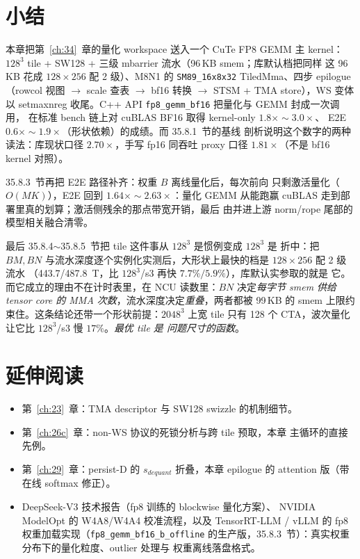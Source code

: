 \section{小结}

本章把第~\ref{ch:34}~章的量化 workspace 送入一个 CuTe FP8 GEMM 主 kernel：
$128^3$ tile + SW128 + 三级 mbarrier 流水（96\,KB smem；库默认档把同样
这 96\,KB 花成 $128\times256$ 配 2 级）、M8N1 的
\texttt{SM89\_16x8x32} TiledMma、四步 epilogue（rowcol 视图 $\to$ scale
查表 $\to$ bf16 转换 $\to$ STSM + TMA store），WS 变体以 setmaxnreg
收尾。C++ API \texttt{fp8\_gemm\_bf16} 把量化与 GEMM 封成一次调用，
在标准 bench 链上对 cuBLAS BF16 取得 kernel-only $1.8\times\sim3.0\times$、
E2E $0.6\times\sim1.9\times$（形状依赖）的成绩。而 35.8.1~节的基线
剖析说明这个数字的两种读法：库现状口径 $2.70\times$，手写 fp16 同吞吐 proxy 口径
$1.81\times$（不是 bf16 kernel 对照）。

35.8.3~节再把 E2E 路径补齐：权重 $B$ 离线量化后，每次前向
只剩激活量化（$O(MK)$），E2E 回到 $1.64\times\sim2.63\times$：量化 GEMM
从能跑赢 cuBLAS 走到部署里真的划算；激活侧残余的那点带宽开销，最后
由并进上游 norm/rope 尾部的模型相关融合清零。

最后 35.8.4$\sim$35.8.5~节把 tile 这件事从 $128^3$ 是惯例变成 $128^3$ 是
折中：把 $BM,BN$ 与流水深度逐个实例化实测后，大形状上最快的档是
$128\times256$ 配 2 级流水
（443.7/487.8~T，比 $128^3$/s3 再快 $7.7\%/5.9\%$），库默认实参取的就是
它。而它成立的理由不在计时表里，在 NCU 读数里：$BN$ 决定\emph{每字节
smem 供给 tensor core 的 MMA 次数}，流水深度决定\emph{重叠}，两者都被
99\,KB 的 smem 上限约束住。这条结论还带一个形状前提：$2048^3$ 上宽 tile
只有 128 个 CTA，波次量化让它比 $128^3$/s3 慢 $17\%$。\emph{最优 tile 是
问题尺寸的函数}。

\section*{延伸阅读}

\begin{itemize}[itemsep=1pt,topsep=2pt]
  \item 第~\ref{ch:23}~章：TMA descriptor 与 SW128 swizzle 的机制细节。
  \item 第~\ref{ch:26c}~章：non-WS 协议的死锁分析与跨 tile 预取，本章
        主循环的直接先例。
  \item 第~\ref{ch:29}~章：persist-D 的 $s_{dequant}$ 折叠，本章 epilogue
        的 attention 版（带在线 softmax 修正）。
\item DeepSeek-V3 技术报告（fp8 训练的 blockwise 量化方案）、
        NVIDIA ModelOpt 的 W4A8/W4A4 校准流程，以及 TensorRT-LLM /
        vLLM 的 fp8 权重加载实现（\texttt{fp8\_gemm\_bf16\_b\_offline}
        的生产版，35.8.3~节）：真实权重分布下的量化粒度、outlier 处理与
        权重离线落盘格式。
\end{itemize}
